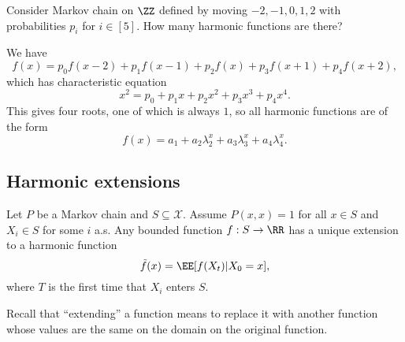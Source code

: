 \begin{example}
\exlabel

Consider Markov chain on $\ZZ$ defined by moving $-2,-1,0,1,2$ with probabilities $p_i$ for $i\in [5]$. How many harmonic functions are there?  
\end{example}

We have 
\[f(x) = p_0f(x-2) + p_1f(x-1) + p_2f(x) + p_3f(x+1) + p_4f(x+2),\] 
which has characteristic equation 
\[x^2 = p_0+p_1x+p_2x^2+p_3x^3+p_4x^4.\]
This gives four roots, one of which is always $1$, so all harmonic functions are of the form 
\[f(x) = a_1+a_2\lambda_2^x+a_3\lambda_3^x+a_4\lambda_4^x.\]

\subsection{Harmonic extensions}

\begin{theorem}
\proplabel

Let $P$ be a Markov chain and $S\subseteq \mathcal{X}$. Assume $P(x,x)=1$ for all $x\in S$ and $X_i\in S$ for some $i$ a.s. Any bounded function $f : S\rightarrow \RR$ has a unique extension to a harmonic function 
\[\tilde{f}(x) = \EE[f(X_t)|X_0=x],\]
where $T$ is the first time that $X_i$ enters $S$. 
\end{theorem}

Recall that ``extending'' a function means to replace it with another function whose values are the same on the domain on the original function. 

